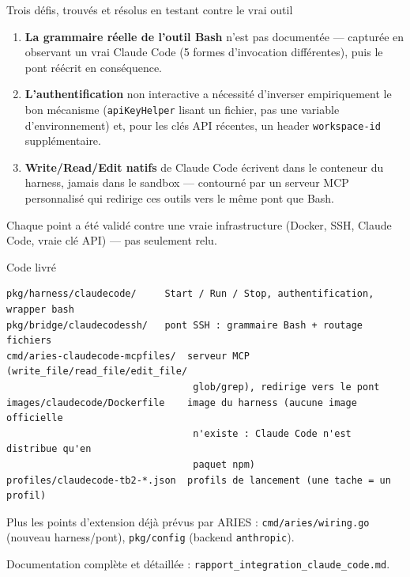 \documentclass[aspectratio=169]{beamer}
\begin{document}
\begin{frame}{Trois défis, trouvés et résolus en testant contre le vrai outil}
\begin{enumerate}
  \item \textbf{La grammaire réelle de l'outil Bash} n'est pas documentée ---
        capturée en observant un vrai Claude Code (5 formes d'invocation
        différentes), puis le pont réécrit en conséquence.
  \item \textbf{L'authentification} non interactive a nécessité d'inverser
        empiriquement le bon mécanisme (\texttt{apiKeyHelper} lisant un
        fichier, pas une variable d'environnement) et, pour les clés API
        récentes, un header \texttt{workspace-id} supplémentaire.
  \item \textbf{Write/Read/Edit natifs} de Claude Code écrivent dans le
        conteneur du harness, jamais dans le sandbox --- contourné par un
        serveur MCP personnalisé qui redirige ces outils vers le même pont
        que Bash.
\end{enumerate}
\vspace{0.2cm}
Chaque point a été validé contre une vraie infrastructure (Docker, SSH,
Claude Code, vraie clé API) --- pas seulement relu.
\end{frame}

\begin{frame}[fragile]{Code livré}
\begin{lstlisting}
pkg/harness/claudecode/     Start / Run / Stop, authentification, wrapper bash
pkg/bridge/claudecodessh/   pont SSH : grammaire Bash + routage fichiers
cmd/aries-claudecode-mcpfiles/  serveur MCP (write_file/read_file/edit_file/
                                 glob/grep), redirige vers le pont
images/claudecode/Dockerfile    image du harness (aucune image officielle
                                 n'existe : Claude Code n'est distribue qu'en
                                 paquet npm)
profiles/claudecode-tb2-*.json  profils de lancement (une tache = un profil)
\end{lstlisting}
Plus les points d'extension déjà prévus par ARIES :
\texttt{cmd/aries/wiring.go} (nouveau harness/pont), \texttt{pkg/config}
(backend \texttt{anthropic}).

\vspace{0.2cm}
Documentation complète et détaillée : \texttt{rapport\_integration\_claude\_code.md}.
\end{frame}

\end{document}
